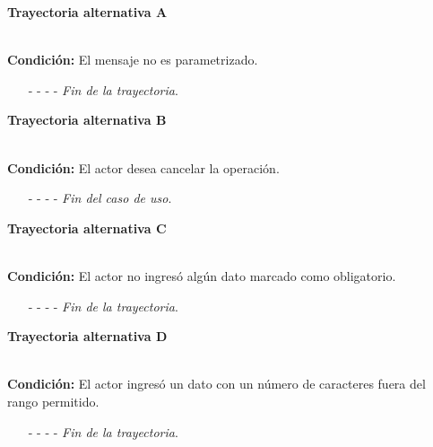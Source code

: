 \hypertarget{CU9-2:TAA}{\textbf{Trayectoria alternativa A}}\\
\noindent \textbf{Condición:} El mensaje no es parametrizado.
\begin{enumerate}
	\UCpaso[\UCsist] Muestra la pantalla .
	\UCpaso[\UCactor] Modifica la información del mensaje. \label{CU9.2-AP-2}
	\UCpaso[\UCsist] Continúa en el paso \ref{CU9.2-P8} de la trayectoria principal.
	\item[- -] - - {\em {Fin de la trayectoria}}.%
\end{enumerate}
\hypertarget{CU9-2:TAB}{\textbf{Trayectoria alternativa B}}\\
\noindent \textbf{Condición:} El actor desea cancelar la operación.
\begin{enumerate}
	\UCpaso[\UCactor] Solicita cancelar la operación oprimiendo el botón  de la pantalla .
	\UCpaso[\UCsist] Muestra la pantalla .
	\item[- -] - - {\em {Fin del caso de uso}}.%
\end{enumerate}
\hypertarget{CU9-2:TAC}{\textbf{Trayectoria alternativa C}}\\
\noindent \textbf{Condición:} El actor no ingresó algún dato marcado como obligatorio.
\begin{enumerate}
	\UCpaso[\UCsist] Muestra el mensaje  señalando el campo que presenta el error en la pantalla .
	\UCpaso Regresa al paso \ref{CU9.2-P6} de la trayectoria principal o al paso \ref{CU9.2-AP-2} de la trayectoria Alternativa A.
	\item[- -] - - {\em {Fin de la trayectoria}}.%
\end{enumerate}
\hypertarget{CU9-2:TAD}{\textbf{Trayectoria alternativa D}}\\
\noindent \textbf{Condición:} El actor ingresó un dato con un número de caracteres fuera del rango permitido.
\begin{enumerate}
	\UCpaso[\UCsist] Muestra el mensaje  señalando el campo que presenta el error en la pantalla .
	\UCpaso Regresa al paso \ref{CU9.2-P6} de la trayectoria principal o al paso \ref{CU9.2-AP-2} de la trayectoria Alternativa A.
	\item[- -] - - {\em {Fin de la trayectoria}}.%
\end{enumerate}
